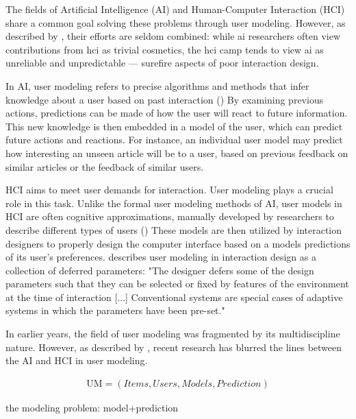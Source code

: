 The fields of Artificial Intelligence (AI) and Human-Computer Interaction (HCI) share a common goal solving these problems through user modeling. 
However, as described by \cite{Lieberman2009}, their efforts are seldom combined: while ai researchers often view contributions from hci as trivial cosmetics, the hci camp
tends to view ai as unreliable and unpredictable --- surefire aspects of poor interaction design.

In AI, user modeling refers to precise algorithms and methods that infer knowledge about a user based on past interaction 
(\cite{Pazzani2007, Smyth2007, Alshamri2008, Resnick1994})  
By examining previous actions, predictions can be made of how the user will react to future information. This new knowledge is then embedded in a model of the user, which can predict future actions and reactions. 
For instance, an individual user model may predict how interesting an unseen article will be to a user, based on previous feedback on similar articles or the feedback of similar users.

HCI aims to meet user demands for interaction. 
User modeling plays a crucial role in this task. 
Unlike the formal user modeling methods of AI, user models in HCI are often cognitive approximations, manually developed by researchers to describe different types of users 
(\cite{Fischer2001, Jameson2009, Cato2001})
These models are then utilized by interaction designers to properly design the computer interface based on a models predictions of its user’s preferences.
\cite{Totterdell1990} describes user modeling in interaction design as a collection of deferred parameters: "The designer defers some of the design parameters such that they can be selected or fixed by features of the environment at the time of interaction [...] Conventional systems are special cases of adaptive systems in which the parameters have been pre-set."

In earlier years, the field of user modeling was fragmented by its multidiscipline nature. 
However, as described by \cite{Kobsa2001}, recent research has blurred the lines between the AI and HCI in user modeling.

\begin{eqnarray}
  \mathrm{UM} = (Items, Users, Models, Prediction)
\end{eqnarray}









the modeling problem: model+prediction

